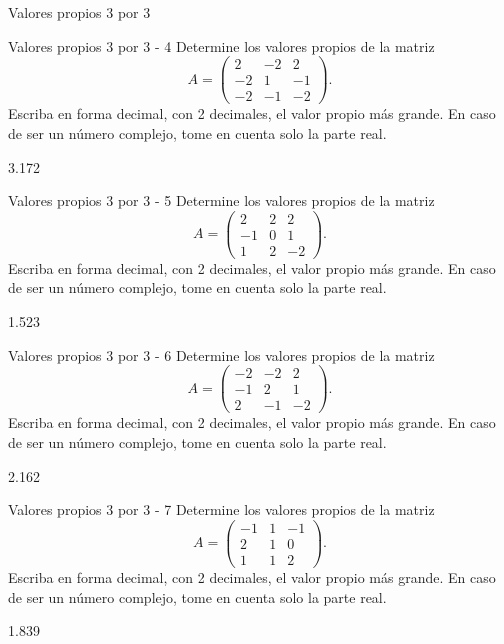\documentclass[a4,11pt]{aleph-notas}
\begin{document}
\begin{quiz}{Valores propios 3 por 3}
\begin{numerical}[tolerance=0.01]%
    {Valores propios 3 por 3 - 4}
    Determine los valores propios de la matriz
    \[
    A = \begin{pmatrix}
    2 & -2 & 2 \\
    -2 & 1 & -1 \\
    -2 & -1 & -2
    \end{pmatrix}.
    \]
    Escriba en forma decimal, con 2 decimales, el valor propio más grande. En caso de ser un número complejo, tome en cuenta solo la parte real.
    \item[] 3.172
\end{numerical}

\begin{numerical}[tolerance=0.01]%
    {Valores propios 3 por 3 - 5}
    Determine los valores propios de la matriz
    \[
    A = \begin{pmatrix}
    2 & 2 & 2 \\
    -1 & 0 & 1 \\
    1 & 2 & -2
    \end{pmatrix}.
    \]
    Escriba en forma decimal, con 2 decimales, el valor propio más grande. En caso de ser un número complejo, tome en cuenta solo la parte real.
    \item[] 1.523
\end{numerical}

\begin{numerical}[tolerance=0.01]%
    {Valores propios 3 por 3 - 6}
    Determine los valores propios de la matriz
    \[
    A = \begin{pmatrix}
    -2 & -2 & 2 \\
    -1 & 2 & 1 \\
    2 & -1 & -2
    \end{pmatrix}.
    \]
    Escriba en forma decimal, con 2 decimales, el valor propio más grande. En caso de ser un número complejo, tome en cuenta solo la parte real.
    \item[] 2.162
\end{numerical}

\begin{numerical}[tolerance=0.01]%
    {Valores propios 3 por 3 - 7}
    Determine los valores propios de la matriz
    \[
    A = \begin{pmatrix}
    -1 & 1 & -1 \\
    2 & 1 & 0 \\
    1 & 1 & 2
    \end{pmatrix}.
    \]
    Escriba en forma decimal, con 2 decimales, el valor propio más grande. En caso de ser un número complejo, tome en cuenta solo la parte real.
    \item[] 1.839
\end{numerical}


\end{quiz}
\end{document}
